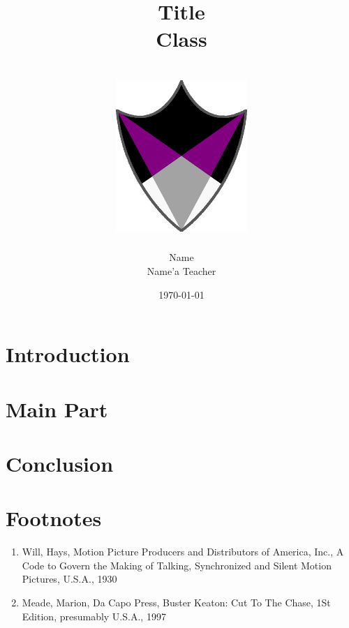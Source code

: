 \documentclass[11pt,a4paper]{article}
\title{
      {Title}\\
      {Class}\\
      {\hrulefill}\\
      {\vspace{1cm}}
      {\includegraphics[width=50mm,scale=1]{aceing_shield.png}}\\
      {\hrulefill}
      }
\author{Name\\Name'a Teacher}
\date{\today}
\begin{document}
\pagestyle{fancy}
\fancyhead{}
\fancyfoot[C]{\thepage}
\renewcommand{\headrulewidth}{1pt}
\renewcommand{\footrulewidth}{0.5pt}

\newcommand{\fakesection}[1]{%
  \par\refstepcounter{section}%
  \sectionmark{#1}%
  \addcontentsline{toc}{section}{\protect\numberline{\thesection}#1}%
}

\newcommand{\fakesubsection}[1]{%
  \par\refstepcounter{subsection}%
  \sectionmark{#1}%
  \addcontentsline{toc}{subsection}{\protect\numberline{\thesubsection}#1}%
}

\onehalfspacing
\maketitle
\thispagestyle{empty}
\newpage
\tableofcontents
\thispagestyle{empty}
\newpage


\section{Introduction}

\clearpage

\section{Main Part}

\clearpage

\section{Conclusion}

\clearpage

\section{Footnotes}

\renewcommand{\labelenumi}{\alph{enumi})} %
\begin{enumerate}
\item Will, Hays, Motion Picture Producers and Distributors of America, Inc., A Code to Govern the Making of Talking, Synchronized and Silent Motion Pictures, U.S.A., 1930
\item Meade, Marion,‎ Da Capo Press, Buster Keaton: Cut To The Chase, 1St Edition, presumably U.S.A., 1997
\end{enumerate}
\end{document}

